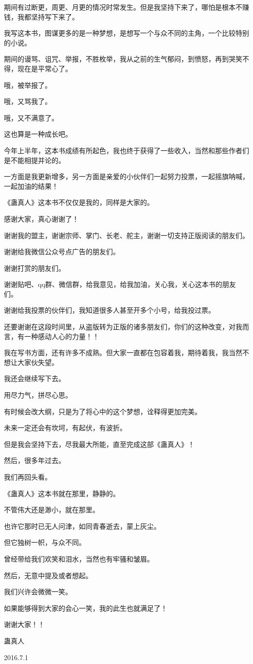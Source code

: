 \begin{this_body}
期间有过断更，周更、月更的情况时常发生。但是我坚持下来了，哪怕是根本不赚钱，我都坚持写下来了。

我写这本书，图谋更多的是一种梦想，是想写一个与众不同的主角，一个比较特别的小说。

期间的谩骂、诅咒、举报，不胜枚举，我从之前的生气郁闷，到愤怒，再到哭笑不得，现在是平常心了。

哦，被举报了。

哦，又骂我了。

哦，又不满意了。

这也算是一种成长吧。

今年上半年，这本书成绩有所起色，我也终于获得了一些收入，当然和那些作者们是不能相提并论的。

一方面是我更新增多，另一方面是亲爱的小伙伴们一起努力投票，一起摇旗呐喊，一起加油的结果！

《蛊真人》这本书不仅仅是我的，同样是大家的。

感谢大家，真心谢谢了！

谢谢我的盟主，谢谢宗师、掌门、长老、舵主，谢谢一切支持正版阅读的朋友们。

谢谢给我微信公众号点广告的朋友们。

谢谢打赏的朋友们。

谢谢贴吧、qq群、微信群，给我意见，给我加油，关心我，关心这本书的朋友们。

谢谢给我投票的伙伴们，我知道很多人甚至开多个小号，给我投过票。

还要谢谢在这段时间里，从盗版转为正版的诸多朋友们，你们的这种改变，对我而言，有一种感动人心的力量！！

我在写书方面，还有许多不成熟。但大家一直都在包容着我，期待着我，我当然不想让大家伙失望。

我还会继续写下去。

用尽力气，拼尽心思。

有时候会改大纲，只是为了将心中的这个梦想，诠释得更加完美。

未来一定还会有坎坷，有起伏，有波折。

但是我会坚持下去，尽我最大所能，直至完成这部《蛊真人》！

然后，很多年过去。

我们再回头看。

《蛊真人》这本书就在那里，静静的。

不管伟大还是渺小，就在那里。

也许它那时已无人问津，如同青春逝去，蒙上灰尘。

但它独树一帜，与众不同。

曾经带给我们欢笑和泪水，当然也有牢骚和皱眉。

然后，无意中提及或者想起。

我们兴许会微微一笑。

如果能够得到大家的会心一笑，我的此生也就满足了！

谢谢大家！！

蛊真人

2016.7.1

\end{this_body}

